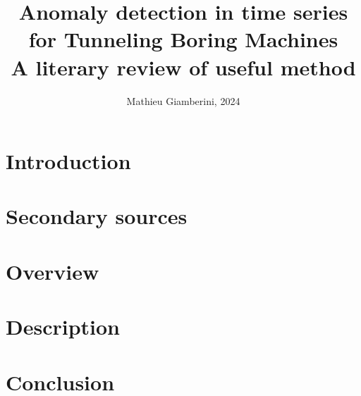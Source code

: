 \documentclass{article}
\title{Anomaly detection in time series for Tunneling Boring Machines \\ \small{A literary review of useful method}}
\author{Mathieu Giamberini, 2024}
\date{}
\begin{document}
    \maketitle
    \begin{abstract}
        
    \end{abstract}
    
    \begin{multicols}{2}
        \cite{dosReis.2016}
        \section*{Introduction}
            

        \section{Secondary sources}
            

        \section{Overview}
            


        \section{Description}
            


        \section*{Conclusion}
            
    
    \end{multicols}
    \printbibliography
\end{document}
